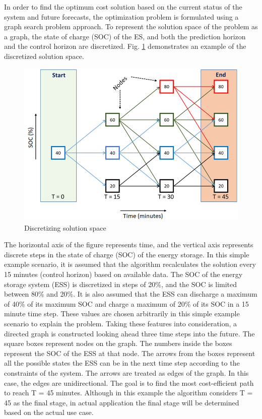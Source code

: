 In order to find the optimum cost solution based on the current status of the system and future forecasts, the optimization problem is formulated using a graph search problem approach. To represent the solution space of the problem as a graph, the state of charge (SOC) of the ES, and both the prediction horizon and the control horizon are discretized. Fig. \ref{fig:F1_Dis} demonstrates an example of the discretized solution space.

\begin{figure}[!ht]
    \centering
    \includegraphics[width = 0.8\linewidth]{figs/F1_1_Dis.png}
    \caption{Discretizing solution space}
    \label{fig:F1_Dis}
\end{figure}

The horizontal axis of the figure represents time, and the vertical axis represents discrete steps in the state of charge (SOC) of the energy storage. In this simple example scenario, it is assumed that the algorithm recalculates the solution every 15 minutes (control horizon) based on available data. The SOC of the energy storage system (ESS) is discretized in steps of 20\%, and the SOC is limited between 80\% and 20\%. It is also assumed that the ESS can discharge a maximum of 40\% of its maximum SOC and charge a maximum of 20\% of its SOC in a 15 minute time step. These values are chosen arbitrarily in this simple example scenario to explain the problem. Taking these features into consideration, a directed graph is constructed looking ahead three time steps into the future. The square boxes represent nodes on the graph. The numbers inside the boxes represent the SOC of the ESS at that node. The arrows from the boxes represent all the possible states the ESS can be in the next time step according to the constraints of the system. The arrows are treated as edges of the graph. In this case, the edges are unidirectional. The goal is to find the most cost-efficient path to reach T = 45 minutes. Although in this example the algorithm considers T = 45 as the final stage, in actual application the final stage will be determined based on the actual use case.

